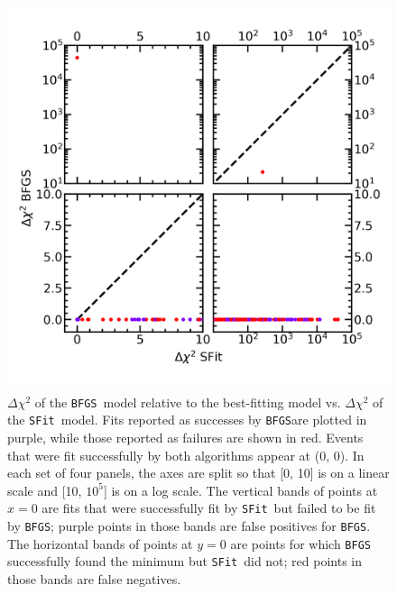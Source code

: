 \documentclass[preprint]{aastex631}
\newcommand{\bfgs}{\texttt{BFGS}}
\newcommand{\sfit}{\texttt{SFit}}
\begin{document}
\begin{figure}
	\begin{centering}
	\includegraphics[height=0.5\textheight]{figs/Dchi2_BFGS.png}
	\caption{$\Delta\chi^2$ of the \bfgs\, model relative to the best-fitting model vs. $\Delta\chi^2$ of the \sfit\, model. Fits reported as successes by \bfgs are plotted in purple, while those reported as failures are shown in red. Events that were fit successfully by both algorithms appear at (0, 0). In each set of four panels, the axes are split so that [0, 10] is on a linear scale and [10, $10^5$] is on a log scale. The vertical bands of points at $x=0$ are fits that were successfully fit by \sfit\, but failed to be fit by \bfgs; purple points in those bands are false positives for \bfgs. The horizontal bands of points at $y=0$ are points for which \bfgs\, successfully found the minimum but \sfit\, did not; red points in those bands are false negatives.
	 \label{fig:dchi2_bfgs}}
	 \end{centering}
\end{figure}
\end{document}
